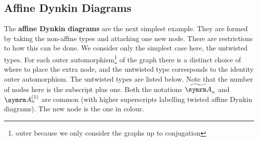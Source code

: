 \documentclass[fleqn, a4paper, openany]{memoir}
\newcommand{\define}[1]{\textbf{#1}}
\begin{document}
    \subsection{Affine Dynkin Diagrams}
    The \define{affine Dynkin diagrams} are the next simplest example.
    They are formed by taking the non-affine types and attaching one new node.
    There are restrictions to how this can be done.
    We consider only the simplest case here, the untwisted types.
    For each outer automorphism\footnote{outer because we only consider the graphs up to conjugation} of the graph there is a distinct choice of where to place the extra node, and the untwisted type corresponds to the identity outer automorphism.
    The untwisted types are listed below.
    Note that the number of nodes here is the subscript plus one.
    Both the notations \(\affA[n]\) and \(\A[n]^{(1)}\) are common (with higher superscripts labelling twisted affine Dynkin diagrams).
    The new node is the one in colour.
\end{document}
